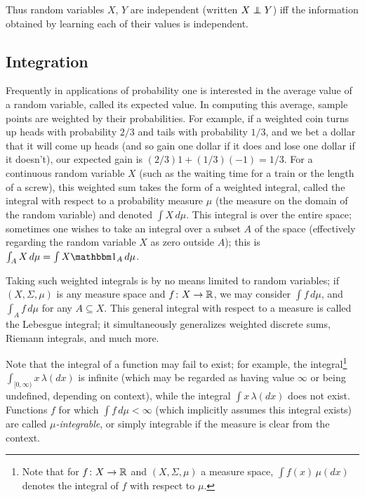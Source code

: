 \documentclass[leqno]{article}
\theoremstyle{definition}
\newcommand\indep{\protect\mathpalette{\protect\independenT}{\perp}}
\def\independenT#1#2{\mathrel{\rlap{$#1#2$}\mkern2mu{#1#2}}}
\begin{document}
Thus random variables $X$, $Y$ are independent (written $X \indep Y$) iff the information obtained by learning each of their values is independent.


\subsection{Integration}

Frequently in applications of probability one is interested in the average value of a random variable, called its expected value. In computing this average, sample points are weighted by their probabilities. For example, if a weighted coin turns up heads with probability $2/3$ and tails with probability $1/3$, and we bet a dollar that it will come up heads (and so gain one dollar if it does and lose one dollar if it doesn't), our expected gain is $(2/3)1 + (1/3)(-1) = 1/3$. For a continuous random variable $X$ (such as the waiting time for a train or the length of a screw), this weighted sum takes the form of a weighted integral, called the integral with respect to a probability measure $\mu$ (the measure on the domain of the random variable) and denoted $\int X \, d\mu$. This integral is over the entire space; sometimes one wishes to take an integral over a subset $A$ of the space (effectively regarding the random variable $X$ as zero outside $A$); this is $\int_A X \, d\mu = \int X \mathbbm 1_A \, d\mu$.

Taking such weighted integrals is by no means limited to random variables; if $(X, \Sigma, \mu)$ is any measure space and $f\colon X \rightarrow \mathbb{R}$, we may consider $\int f \, d\mu$, and $\int_A f \, d\mu$ for any $A \subseteq X$. This general integral with respect to a measure is called the Lebesgue integral; it simultaneously generalizes weighted discrete sums, Riemann integrals, and much more.

Note that the integral of a function may fail to exist; for example, the integral\footnote{Note that for $f\colon X \rightarrow \mathbb{R}$ and $(X,\Sigma,\mu)$ a measure space, $\int f(x) \, \mu(dx)$ denotes the integral of $f$ with respect to $\mu$.} $\int_{[0,\infty)} x \, \lambda(dx)$ is infinite (which may be regarded as having value $\infty$ or being undefined, depending on context), while the integral $\int x \, \lambda(dx)$ does not exist. Functions $f$ for which $\int f \, d\mu < \infty$ (which implicitly assumes this integral exists) are called {\em $\mu$-integrable}, or simply integrable if the measure is clear from the context.
\end{document}
